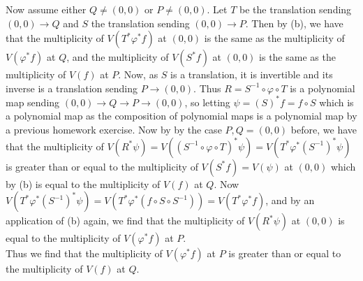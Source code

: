 \documentclass[a4paper]{article}
\begin{document}
Now assume either $Q \neq (0,0)$ or $P\neq (0,0)$. Let
$T$ be the translation sending  $(0,0) \to Q$ and $S$ the translation sending
$(0,0) \to P$. Then by (b), we have
that the multiplicity of $V\left( T^{*} \varphi^{*}f \right) $ at $(0,0)$ is
the same as the multiplicity of $V\left( \varphi^{*}f \right) $ at $Q$, and
the multiplicity of $V\left( S^{*} f \right) $ at $(0,0)$ is the same as
the multiplicity of $V( f)$ at $P$. Now, as $S$ is a translation, it is
invertible and its inverse is a translation sending $P \to (0,0)$. Thus
$R = S^{-1} \circ \varphi \circ T$ is a polynomial map sending
$(0,0) \to Q \to P \to (0,0)$, so letting $\psi = \left( S \right)^{*}f = 
f \circ S$ which is a polynomial map as the composition of polynomial maps
is a polynomial map by a previous homework exercise. Now
by by the case $P,Q = (0,0)$ before, we have
that the multiplicity of $V\left( R^{*} \psi \right) 
= V\left( \left( S^{-1} \circ \varphi \circ T \right)^{*} \psi \right) 
= V\left( T^{*} \varphi^{*} \left( S^{-1} \right)^{*} \psi  \right) $ is
greater
than or equal to the multiplicity of $V \left( S^{*}f \right) = V(\psi)$ at
$(0,0)$ which by (b) is equal to the multiplicity of $V(f)$ at $Q$.
Now $V\left( T^{*} \varphi^{*} \left( S^{-1} \right)^{*} \psi \right) 
= V\left( T^{*} \varphi^{*} \left( f \circ S \circ S^{-1} \right)  \right) 
= V\left( T^{*} \varphi^{*} f \right) $, and by an application of (b) again, we
find that the multiplicity of $V(R^{*}\psi)$ at $(0,0)$ is equal to
the multiplicity of $V\left( \varphi^{*}f \right) $ at $P$.\\
Thus we find that the multiplicity of 
$V\left( \varphi^{*}f \right) $ at $P$ is greater than or equal to the
multiplicity of
$V(f)$ at $Q$.
\end{document}
